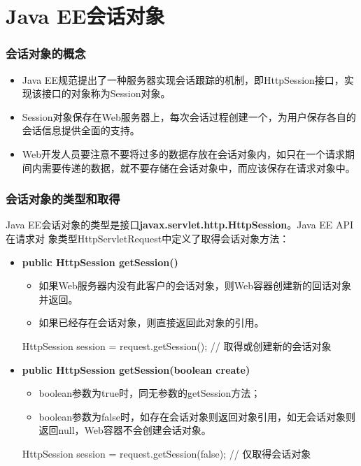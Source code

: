 
\section{Java EE会话对象}

\begin{frame}[fragile] %
\frametitle{会话对象的概念}
\begin{itemize}
\item Java EE规范提出了一种服务器实现会话跟踪的机制，即HttpSession接口，实现该接口的对象称为Session对象。
\item Session对象保存在Web服务器上，每次会话过程创建一个，为用户保存各自的会话信息提供全面的支持。
\item Web开发人员要注意不要将过多的数据存放在会话对象内，如只在一个请求期间内需要传递的数据，就不要存储在会话对象中，而应该保存在{\Red\hei 请求对象}中。
\end{itemize}
\end{frame}

\begin{frame}[fragile] %
\frametitle{会话对象的类型和取得} 

Java EE会话对象的类型是接口{\Blue\bf javax.servlet.http.HttpSession}。Java EE API在请求对
象类型HttpServletRequest中定义了取得会话对象方法：

\begin{itemize}
\item {\bf public HttpSession getSession()}\\
\begin{itemize}
\item 如果Web服务器内没有此客户的会话对象，则Web容器创建新的回话对象并返回。
\item 如果已经存在会话对象，则直接返回此对象的引用。
\end{itemize}
\begin{javaCode}
HttpSession session = request.getSession();  // 取得或创建新的会话对象
\end{javaCode}

\item {\bf public HttpSession getSession(boolean create)}\\
\begin{itemize}
\item boolean参数为true时，同无参数的getSession方法；
\item boolean参数为false时，如存在会话对象则返回对象引用，如无会话对象则返回null，Web容器不会创建会话对象。
\end{itemize}
\begin{javaCode}
HttpSession session = request.getSession(false);  // 仅取得会话对象
\end{javaCode}
\end{itemize}
\end{frame}


